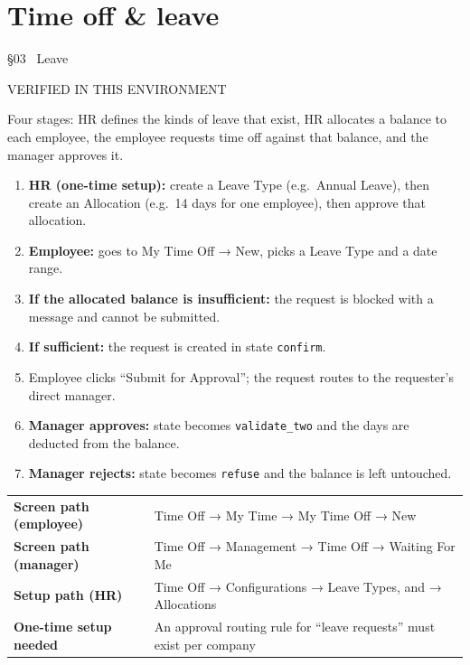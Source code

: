 \documentclass[11pt,a4paper]{article}
\newcommand{\eyebrow}[1]{{\small\ttfamily\color{accentdark} #1}\par\vspace{2pt}}
\begin{document}
\section{Time off \& leave}
\eyebrow{\S03 \textperiodcentered\ Leave}
\begin{statusbox}{VERIFIED IN THIS ENVIRONMENT}\end{statusbox}

Four stages: HR defines the kinds of leave that exist, HR allocates a balance to each employee, the employee requests time off against that balance, and the manager approves it.

\begin{enumerate}[leftmargin=1.8em]
  \item \textbf{HR (one-time setup):} create a Leave Type (e.g.\ Annual Leave), then create an Allocation (e.g.\ 14 days for one employee), then approve that allocation.
  \item \textbf{Employee:} goes to My Time Off → New, picks a Leave Type and a date range.
  \item \textbf{If the allocated balance is insufficient:} the request is blocked with a message and cannot be submitted.
  \item \textbf{If sufficient:} the request is created in state \texttt{confirm}.
  \item Employee clicks ``Submit for Approval''; the request routes to the requester's direct manager.
  \item \textbf{Manager approves:} state becomes \texttt{validate\_two} and the days are deducted from the balance.
  \item \textbf{Manager rejects:} state becomes \texttt{refuse} and the balance is left untouched.
\end{enumerate}

\begin{center}
\small
\begin{tabular}{@{}p{4.4cm}p{9.1cm}@{}}
\toprule
\textbf{Screen path (employee)} & Time Off → My Time → My Time Off → New \\
\textbf{Screen path (manager)} & Time Off → Management → Time Off → Waiting For Me \\
\textbf{Setup path (HR)} & Time Off → Configurations → Leave Types, and → Allocations \\
\textbf{One-time setup needed} & An approval routing rule for ``leave requests'' must exist per company \\
\bottomrule
\end{tabular}
\end{center}
\end{document}
